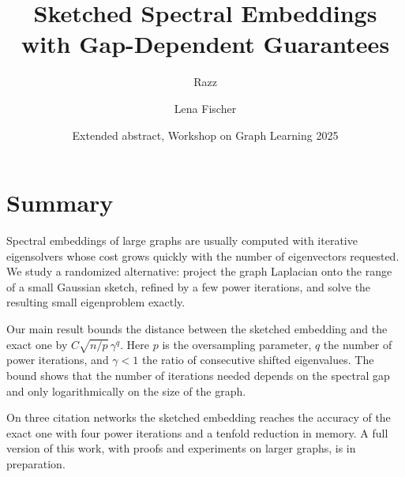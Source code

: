 \documentclass[11pt]{article}
\title{Sketched Spectral Embeddings with Gap-Dependent Guarantees}
\author{Razz \and Lena Fischer}
\date{Extended abstract, Workshop on Graph Learning 2025}
\begin{document}
\maketitle

\section*{Summary}

Spectral embeddings of large graphs are usually computed with iterative eigensolvers whose cost grows quickly with the number of eigenvectors requested. We study a randomized alternative: project the graph Laplacian onto the range of a small Gaussian sketch, refined by a few power iterations, and solve the resulting small eigenproblem exactly.

Our main result bounds the distance between the sketched embedding and the exact one by $C \sqrt{n / p} \, \gamma^{q}$. Here $p$ is the oversampling parameter, $q$ the number of power iterations, and $\gamma < 1$ the ratio of consecutive shifted eigenvalues. The bound shows that the number of iterations needed depends on the spectral gap and only logarithmically on the size of the graph.

On three citation networks the sketched embedding reaches the accuracy of the exact one with four power iterations and a tenfold reduction in memory. A full version of this work, with proofs and experiments on larger graphs, is in preparation.
\end{document}
